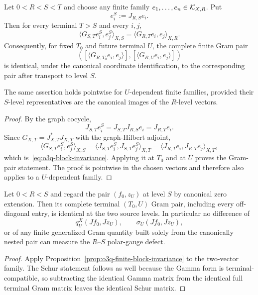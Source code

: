 \begin{proposition}
\label{prop:o3q-finite-block-invariance}
Let $0<R<S<T$ and choose any finite family
$e_1,\dots,e_n\in\mathcal K_{X,R}$.  Put
\[
 e_i^S:=J_{R,S}e_i.
\]
Then for every terminal $T>S$ and every $i,j$,
\[
 \boxed{
 \langle G_{S,T}e_i^S,e_j^S\rangle_{X,S}
 =
 \langle G_{R,T}e_i,e_j\rangle_{X,R}.
 }
\tag{O3Q.8}\label{eq:o3q-block-invariance}
\]
Consequently, for fixed $T_0$ and future terminal $U$, the complete finite Gram pair
\[
 \left(
 [\langle G_{R,T_0}e_i,e_j\rangle],
 [\langle G_{R,U}e_i,e_j\rangle]
 \right)
\]
is identical, under the canonical coordinate identification, to the corresponding
pair after transport to level $S$.

The same assertion holds pointwise for $U$-dependent finite families, provided their
$S$-level representatives are the canonical images of the $R$-level vectors.
\end{proposition}

\begin{proof}
By the graph cocycle,
\[
 J_{S,T}e_i^S
 =J_{S,T}J_{R,S}e_i
 =J_{R,T}e_i.
\]
Since $G_{X,T}=J_{X,T}^*J_{X,T}$ with the graph-Hilbert adjoint,
\[
 \langle G_{S,T}e_i^S,e_j^S\rangle_{X,S}
 =\langle J_{S,T}e_i^S,J_{S,T}e_j^S\rangle_{X,T}
 =\langle J_{R,T}e_i,J_{R,T}e_j\rangle_{X,T},
\]
which is~\eqref{eq:o3q-block-invariance}.  Applying it at $T_0$ and at $U$ proves the
Gram-pair statement.  The proof is pointwise in the chosen vectors and therefore also
applies to a $U$-dependent family.
\end{proof}

\begin{corollary}
\label{cor:o3q-mixed-no-gauge}
Let $0<R<S$ and regard the pair $(f_0,z_U)$ at level $S$ by canonical zero extension.
Then its complete terminal $(T_0,U)$ Gram pair, including every off-diagonal entry, is
identical at the two source levels.  In particular no difference of
\[
 q_U^X(Jf_0,Jz_U),
 \qquad
 \sigma_U(Jf_0,Jz_U),
\]
or of any finite generalized Gram quantity built solely from the canonically nested
pair can measure the $R$--$S$ polar-gauge defect.
\end{corollary}

\begin{proof}
Apply Proposition~\ref{prop:o3q-finite-block-invariance} to the two-vector family.  The
Schur statement follows as well because the Gamma form is terminal-compatible, so
subtracting the identical Gamma matrix from the identical full terminal Gram matrix
leaves the identical Schur matrix.
\end{proof}


